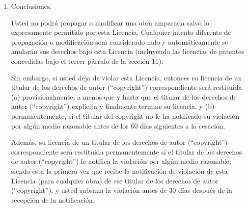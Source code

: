 {\begin{enumerate}
Todos los dem\'{a}s t\'{e}rminos adicionales no permisivos son consideradas 
``restricciones extra'' en el sentido de la secci\'{o}n 10.  Si el Programa, tal cual se 
recibi\'{o}, o cualquier parte del mismo, contiene un aviso indicando que se 
encuentra cubierto por esta Licencia junto con un t\'{e}rmino que es otra restricci\'{o}n,
se puede quitar ese t\'{e}rmino.  Si un documento de licencia contiene una restricci\'{o}n
adicional, pero permite relicenciar o redistribuir bajo esta Licencia, se puede 
a\~nadir a un material de la obra derivada bajo los t\'{e}rminos de ese documento de 
licencia, a condici\'{o}n de que dicha restricci\'{o}n no sobreviva el relicenciamiento 
o redistribuci\'{o}n.

Si se a\~naden t\'{e}rminos a una obra derivada de acuerdo con esta secci\'{o}n, se debe 
colocar, en los archivos fuente involucrados, una declaraci\'{o}n de los t\'{e}rminos adicionales aplicables a esos archivos, o un aviso indicando donde encontrar los t\'{e}rminos aplicables.

Las t\'{e}rminos adicionales, permisivos o no permisivos, pueden aparecer en forma de 
una licencia escrita por separado, o figurar como excepciones; los requisitos anteriores son aplicables en cualquier forma.

\item Conclusiones.

Usted no podr\'{a} propagar o modificar una obra amparada salvo lo
expresamente permitido por esta Licencia.  Cualquier intento
diferente de propagaci\'{o}n o modificaci\'{o}n ser\'{a} considerado nulo y
autom\'{a}ticamente se anular\'{a}n sus derechos bajo esta Licencia
(incluyendo las licencias de patentes concedidas bajo el tercer
p\'{a}rrafo de la secci\'{o}n 11).

Sin embargo, si usted deja de violar esta Licencia, entonces su
licencia de un titular de los derechos de autor (``copyright'') correspondiente ser\'{a}
restituida (a) provisionalmente, a menos que y hasta que el titular de los derechos de autor (``copyright'') expl\'{i}cita y finalmente termine su licencia, y (b) permanentemente,
si el titular del copyright no le ha notificado su violaci\'{o}n por
alg\'{u}n medio razonable antes de los 60 d\'{i}as siguientes a la cesaci\'{o}n.

Adem\'{a}s, su licencia de un titular de los derechos de autor (``copyright'')
correspondiente ser\'{a} restituida permanentemente si el titular de los derechos de autor (``copyright'') le notifica la violaci\'{o}n por alg\'{u}n medio razonable,
siendo \'{e}sta la primera vez que recibe la notificaci\'{o}n de violaci\'{o}n de
esta Licencia (para cualquier obra) de ese titular de los derechos de autor (``copyright''), y
usted subsana la violaci\'{o}n antes de 30 d\'{i}as despu\'{e}s de la recepci\'{o}n
de la notificaci\'{o}n.


\end{enumerate}}

